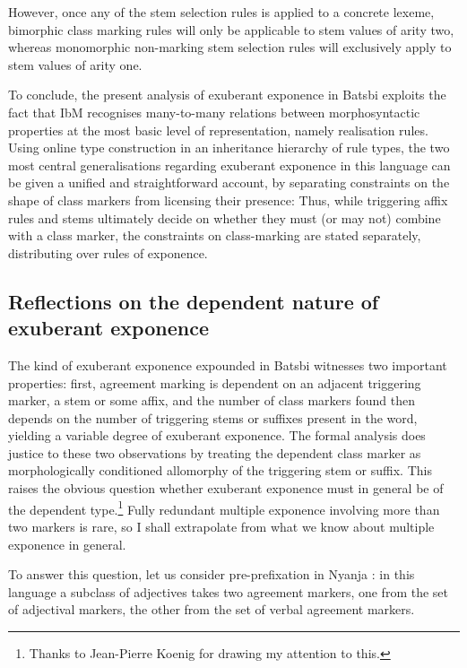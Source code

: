 \documentclass[output=paper]{langsci/langscibook}
\begin{document}
However, once any of the stem selection rules is applied to a concrete
lexeme, bimorphic class marking rules will only be applicable to stem
values of arity two, whereas monomorphic non-marking stem
selection rules will exclusively apply to stem values of arity
one.

To conclude, the present analysis of exuberant exponence in Batsbi
exploits the fact that IbM recognises many-to-many relations between
morphosyntactic properties at the most basic level of representation,
namely realisation rules. Using  online type
construction in an inheritance  hierarchy of rule types, the two most
central generalisations regarding exuberant exponence in this language
can be given a unified and straightforward account, by separating
constraints on the shape of class markers from licensing their
presence: Thus, while triggering affix rules and stems ultimately
decide on whether they must (or may not) combine with a class marker,
the constraints on class-marking are stated separately, distributing
over rules of exponence.  

\subsection{Reflections on the dependent nature of exuberant exponence}

The kind of exuberant exponence expounded in Batsbi witnesses two
important properties: first, agreement marking is dependent on an
adjacent triggering marker, a stem or some affix, and the number of
class markers found then depends on the number of triggering stems or
suffixes present in the word, yielding a variable degree of exuberant
exponence. The formal analysis does justice to these two observations
by treating the dependent class marker as morphologically conditioned
allomorphy of the triggering stem or suffix. This raises the obvious
question whether exuberant exponence must in general be of the
dependent type.\footnote{Thanks to Jean-Pierre Koenig for drawing
  my attention to this.} Fully redundant multiple exponence involving
more than two markers is rare, so I shall extrapolate from what we
know about multiple exponence in general.

To answer this question, let us consider pre-prefixation in Nyanja
\citep{Stump01,Crysmann:14:OUP}: in
this language a subclass of adjectives takes two agreement markers,
one from the set of adjectival markers, the other from the set of
verbal agreement markers.\largerpage
\end{document}
